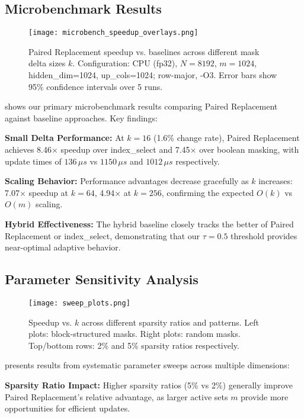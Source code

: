 \documentclass{article}
\numberwithin{equation}{section}
\theoremstyle{plain}
\theoremstyle{definition}
\theoremstyle{remark}
\begin{document}
\subsection{Microbenchmark Results}

\begin{figure}[t]
\centering
\texttt{[image: microbench\_speedup\_overlays.png]}
\caption{Paired Replacement speedup vs. baselines across different mask delta sizes $k$. Configuration: CPU (fp32), $N=8192$, $m=1024$, hidden\_dim=1024, up\_cols=1024; row-major, -O3. Error bars show 95\% confidence intervals over 5 runs.}
\label{fig:microbench_speedup}
\end{figure}

 shows our primary microbenchmark results comparing Paired Replacement against baseline approaches. Key findings:

\textbf{Small Delta Performance:} At $k=16$ (1.6\% change rate), Paired Replacement achieves 8.46$\times$ speedup over index\_select and 7.45$\times$ over boolean masking, with update times of $136\,\mu s$ vs $1150\,\mu s$ and $1012\,\mu s$ respectively.

\textbf{Scaling Behavior:} Performance advantages decrease gracefully as $k$ increases: 7.07$\times$ speedup at $k=64$, 4.94$\times$ at $k=256$, confirming the expected $O(k)$ vs $O(m)$ scaling.

\textbf{Hybrid Effectiveness:} The hybrid baseline closely tracks the better of Paired Replacement or index\_select, demonstrating that our $\tau=0.5$ threshold provides near-optimal adaptive behavior.

\subsection{Parameter Sensitivity Analysis}

\begin{figure}[t]
\centering
\texttt{[image: sweep\_plots.png]}
\caption{Speedup vs. $k$ across different sparsity ratios and patterns. Left plots: block-structured masks. Right plots: random masks. Top/bottom rows: 2\% and 5\% sparsity ratios respectively.}
\label{fig:parameter_sweep}
\end{figure}

 presents results from systematic parameter sweeps across multiple dimensions:

\textbf{Sparsity Ratio Impact:} Higher sparsity ratios (5\% vs 2\%) generally improve Paired Replacement's relative advantage, as larger active sets $m$ provide more opportunities for efficient updates.
\end{document}

